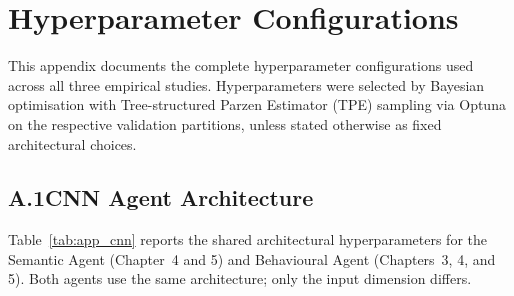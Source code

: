 
\chapter{Hyperparameter Configurations}
\label{app:hyperparameters}

This appendix documents the complete hyperparameter configurations used across all three
empirical studies.
Hyperparameters were selected by Bayesian optimisation with Tree-structured Parzen Estimator
(TPE) sampling via Optuna \cite{optuna2019} on the respective validation partitions, unless
stated otherwise as fixed architectural choices.

\section*{A.1\quad CNN Agent Architecture}

Table~\ref{tab:app_cnn} reports the shared architectural hyperparameters for the Semantic
Agent (Chapter~4 and 5) and Behavioural Agent (Chapters~3, 4, and 5).
Both agents use the same architecture; only the input dimension differs.

